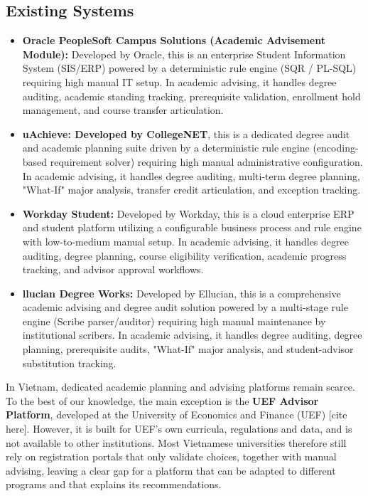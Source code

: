    \subsection{Existing Systems}

\begin{itemize}
    \item \textbf{Oracle PeopleSoft Campus Solutions (Academic Advisement Module):} Developed by Oracle, this is an enterprise Student Information System (SIS/ERP) powered by a deterministic rule engine (SQR / PL-SQL) requiring high manual IT setup. In academic advising, it handles degree auditing, academic standing tracking, prerequisite validation, enrollment hold management, and course transfer articulation.
    \item \textbf{uAchieve: Developed by CollegeNET}, this is a dedicated degree audit and academic planning suite driven by a deterministic rule engine (encoding-based requirement solver) requiring high manual administrative configuration. In academic advising, it handles degree auditing, multi-term degree planning, "What-If" major analysis, transfer credit articulation, and exception tracking.
    \item \textbf{Workday Student:} Developed by Workday, this is a cloud enterprise ERP and student platform utilizing a configurable business process and rule engine with low-to-medium manual setup. In academic advising, it handles degree auditing, degree planning, course eligibility verification, academic progress tracking, and advisor approval workflows.
    \item \textbf{llucian Degree Works:} Developed by Ellucian, this is a comprehensive academic advising and degree audit solution powered by a multi-stage rule engine (Scribe parser/auditor) requiring high manual maintenance by institutional scribers. In academic advising, it handles degree auditing, degree planning, prerequisite audits, "What-If" major analysis, and student-advisor substitution tracking.
\end{itemize}

In Vietnam, dedicated academic planning and advising platforms remain scarce. To the best of our knowledge, the main exception is the \textbf{UEF Advisor Platform}, developed at the University of Economics and Finance (UEF) [cite here]. However, it is built for UEF's own curricula, regulations and data, and is not available to other institutions. Most Vietnamese universities therefore still rely on registration portals that only validate choices, together with manual advising, leaving a clear gap for a platform that can be adapted to different programs and that explains its recommendations.

